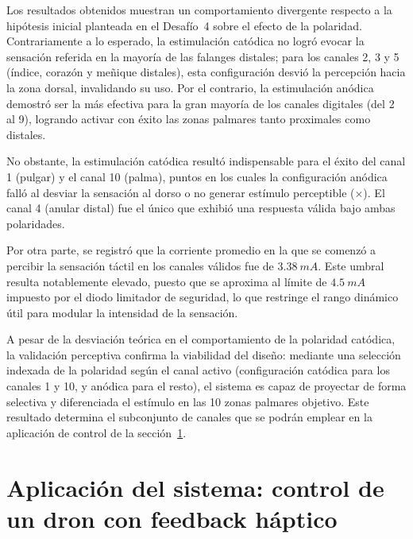 \documentclass[12pt]{article}
\begin{document}
Los resultados obtenidos muestran un comportamiento divergente respecto a la hipótesis inicial planteada en el Desafío~4 sobre el efecto de la polaridad. Contrariamente a lo esperado, la estimulación catódica no logró evocar la sensación referida en la mayoría de las falanges distales; para los canales 2, 3 y 5 (índice, corazón y meñique distales), esta configuración desvió la percepción hacia la zona dorsal, invalidando su uso. Por el contrario, la estimulación anódica demostró ser la más efectiva para la gran mayoría de los canales digitales (del 2 al 9), logrando activar con éxito las zonas palmares tanto proximales como distales. 

No obstante, la estimulación catódica resultó indispensable para el éxito del canal 1 (pulgar) y el canal 10 (palma), puntos en los cuales la configuración anódica falló al desviar la sensación al dorso o no generar estímulo perceptible ($\times$). El canal 4 (anular distal) fue el único que exhibió una respuesta válida bajo ambas polaridades. 

Por otra parte, se registró que la corriente promedio en la que se comenzó a percibir la sensación táctil en los canales válidos fue de $3.38~mA$. Este umbral resulta notablemente elevado, puesto que se aproxima al límite de $4.5~mA$ impuesto por el diodo limitador de seguridad, lo que restringe el rango dinámico útil para modular la intensidad de la sensación. 

A pesar de la desviación teórica en el comportamiento de la polaridad catódica, la validación perceptiva confirma la viabilidad del diseño: mediante una selección indexada de la polaridad según el canal activo (configuración catódica para los canales 1 y 10, y anódica para el resto), el sistema es capaz de proyectar de forma selectiva y diferenciada el estímulo en las 10 zonas palmares objetivo. Este resultado determina el subconjunto de canales que se podrán emplear en la aplicación de control de la sección~\ref{sec:dron}.


\section{Aplicación del sistema: control de un dron con feedback háptico}
\label{sec:dron}
\end{document}
